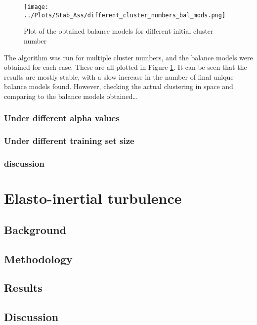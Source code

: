 \documentclass[12pt]{report} %
\begin{document}
\begin{figure}[htbp]
  \centering
  \texttt{[image: ../Plots/Stab\_Ass/different\_cluster\_numbers\_bal\_mods.png]}
  \caption{Plot of the obtained balance models for different initial cluster number}
  \label{fig:diff_clust_num_bal_mods}
\end{figure}

The algorithm was run for multiple cluster numbers, and the balance models were obtained for each case. These are all plotted in Figure \ref{fig:diff_clust_num_bal_mods}. It can be seen that the results are mostly stable, with a slow increase in the number of final unique balance models found. However, checking the actual clustering in space and comparing to the balance models obtained…

\subsection{Under different alpha values}



\subsection{Under different training set size}

\subsection{discussion}

\chapter{Elasto-inertial turbulence}

\section{Background}

\section{Methodology}

\section{Results}

\section{Discussion}
\end{document}
